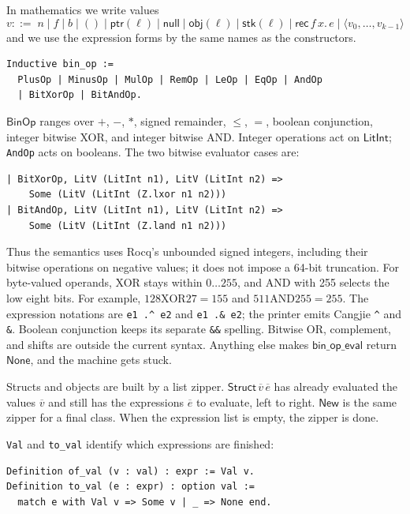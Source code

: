 \documentclass[11pt]{article}
\newcommand{\None}{\mathsf{None}}
\newcommand{\Unit}{\mathsf{()}}
\newcommand{\NULL}{\mathsf{null}}
\begin{document}
In mathematics we write values
\[
v ::=\;
  n \mid f \mid b \mid \Unit \mid \mathsf{ptr}(\ell) \mid \NULL
  \mid \mathsf{obj}(\ell) \mid \mathsf{stk}(\ell)
  \mid \mathsf{rec}\,f\,x.\,e
  \mid \langle v_0,\ldots,v_{k-1}\rangle
\]
and we use the expression forms by the same names as the constructors.
\begin{lstlisting}
Inductive bin_op :=
  PlusOp | MinusOp | MulOp | RemOp | LeOp | EqOp | AndOp
  | BitXorOp | BitAndOp.
\end{lstlisting}

\(\mathsf{BinOp}\) ranges over \(+\), \(-\), \(*\), signed remainder, \(\le\), \(=\),
boolean conjunction, integer bitwise XOR, and integer bitwise AND.
Integer operations act on \(\mathsf{LitInt}\); \texttt{AndOp} acts on booleans.
The two bitwise evaluator cases are:
\begin{lstlisting}
| BitXorOp, LitV (LitInt n1), LitV (LitInt n2) =>
    Some (LitV (LitInt (Z.lxor n1 n2)))
| BitAndOp, LitV (LitInt n1), LitV (LitInt n2) =>
    Some (LitV (LitInt (Z.land n1 n2)))
\end{lstlisting}
Thus the semantics uses Rocq's unbounded signed integers, including their
bitwise operations on negative values; it does not impose a 64-bit truncation.
For byte-valued operands, XOR stays within \(0\ldots255\), and AND with 255
selects the low eight bits. For example, \(128\mathbin{\mathrm{XOR}}27=155\)
and \(511\mathbin{\mathrm{AND}}255=255\).
The expression notations are \texttt{e1 .\textasciicircum{} e2} and
\texttt{e1 .\& e2}; the printer emits Cangjie \texttt{\textasciicircum} and
\texttt{\&}. Boolean conjunction keeps its separate \texttt{\&\&} spelling.
Bitwise OR, complement, and shifts are outside the current syntax.
Anything else makes \(\mathsf{bin\_op\_eval}\) return \(\None\), and the machine gets stuck.

Structs and objects are built by a list zipper.
\(\mathsf{Struct}\,\overline{v}\,\overline{e}\) has already evaluated the values \(\overline{v}\) and still has the expressions \(\overline{e}\) to evaluate, left to right.
\(\mathsf{New}\) is the same zipper for a final class.
When the expression list is empty, the zipper is done.

\texttt{Val} and \texttt{to\_val} identify which expressions are finished:

\begin{lstlisting}
Definition of_val (v : val) : expr := Val v.
Definition to_val (e : expr) : option val :=
  match e with Val v => Some v | _ => None end.
\end{lstlisting}
\end{document}

